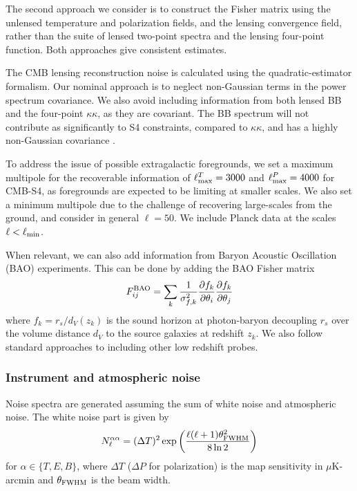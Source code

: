 The second approach we consider is to construct the Fisher matrix using the unlensed temperature and polarization fields, and the lensing convergence field, rather than the suite of lensed two-point spectra and the lensing four-point function. Both approaches give consistent estimates.

The CMB lensing reconstruction noise is calculated using the \cite{Hu:2002} quadratic-estimator formalism. Our nominal approach is to neglect non-Gaussian terms in the power spectrum covariance. We also avoid including information from both lensed BB and the four-point $\kappa \kappa$, as they are covariant. The BB spectrum will not contribute as significantly to S4 constraints, compared to $\kappa \kappa$, and has a highly non-Gaussian covariance \cite{Benoit-Levy:2012}. 

To address the issue of possible extragalactic foregrounds, we set a maximum multipole for the recoverable information of $\ell^T_{\rm max} = 3000$ and $\ell^P_{\rm max} = 4000$ for CMB-S4, as foregrounds are expected to be limiting at smaller scales. We also set a minimum multipole due to the challenge of recovering large-scales from the ground, and consider in general $\ell=50$. We include Planck data at the scales $\ell<\ell_{\rm min}$. 

When relevant, we can also add information from Baryon Acoustic Oscillation (BAO) experiments. This can be done by adding the BAO Fisher matrix
%
\begin{equation}
F_{ij}^{\rm BAO} = \sum_{k} \frac{1}{\sigma_{f,k}^2}\frac{\partial f_k}{\partial \theta_i}\frac{\partial f_k}{\partial \theta_j}
\end{equation}
%
where $f_k = r_s/d_V(z_k)$ is the sound horizon at photon-baryon decoupling $r_s$ over the volume distance $d_V$ to the source galaxies at redshift $z_k$. We also follow standard approaches to including other low redshift probes.

\subsubsection{Instrument and atmospheric noise}
Noise spectra are generated assuming the sum of white noise and atmospheric noise. The white noise part is given by
%
\begin{equation}
N^{\alpha \alpha}_\ell = (\Delta T)^2 \exp \left( \frac{\ell(\ell + 1) \theta^2_{\rm FWHM}}{8 \ln 2} \right)
\end{equation}
%
for $\alpha \in \{T, E, B\}$, where $\Delta T$ ($\Delta P$ for polarization) is the map sensitivity in $\mu$K-arcmin and $\theta_{\rm FWHM}$ is the beam width. 

